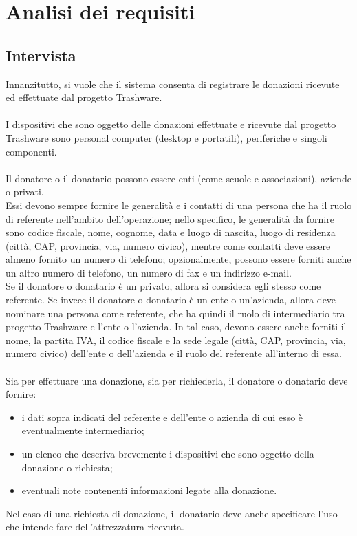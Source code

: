 \documentclass[a4paper,12pt]{report}
\begin{document}

\tableofcontents


\chapter{Analisi dei requisiti}

\section{Intervista}

Innanzitutto, si vuole che il sistema consenta di registrare le donazioni ricevute ed effettuate dal progetto Trashware.
\\\\
I dispositivi che sono oggetto delle donazioni effettuate e ricevute dal progetto Trashware sono personal computer (desktop e portatili), periferiche e singoli componenti. 
\\\\
Il donatore o il donatario possono essere enti (come scuole e associazioni), aziende o privati. \\
Essi devono sempre fornire le generalità e i contatti di una persona che ha il ruolo di referente nell'ambito dell'operazione; nello specifico, le generalità da fornire sono codice fiscale, nome, cognome, data e luogo di nascita, luogo di residenza (città, CAP, provincia, via, numero civico), mentre come contatti deve essere almeno fornito un numero di telefono; opzionalmente, possono essere forniti anche un altro numero di telefono, un numero di fax e un indirizzo e-mail. \\
Se il donatore o donatario è un privato, allora si considera egli stesso come referente. Se invece il donatore o donatario è un ente o un'azienda, allora deve nominare una persona come referente, che ha quindi il ruolo di intermediario tra progetto Trashware e l'ente o l'azienda. In tal caso, devono essere anche forniti il nome, la partita IVA, il codice fiscale e la sede legale (città, CAP, provincia, via, numero civico) dell'ente o dell'azienda e il ruolo del referente all'interno di essa.
\\\\
Sia per effettuare una donazione, sia per richiederla, il donatore o donatario deve fornire:
\begin{itemize}
	\item i dati sopra indicati del referente e dell'ente o azienda di cui esso è eventualmente intermediario;
	\item un elenco che descriva brevemente i dispositivi che sono oggetto della donazione o richiesta;
	\item eventuali note contenenti informazioni legate alla donazione.
\end{itemize}
Nel caso di una richiesta di donazione, il donatario deve anche specificare l’uso che intende fare dell'attrezzatura ricevuta. \\
\end{document}
